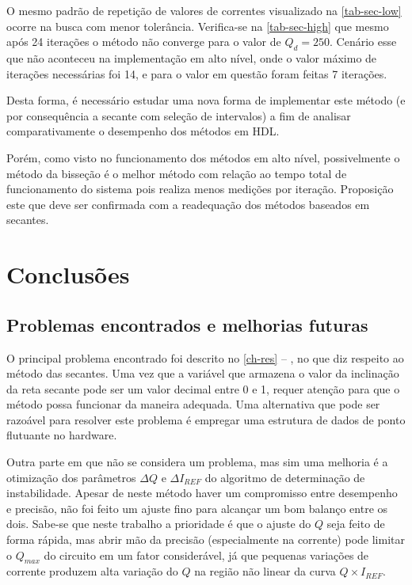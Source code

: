 O mesmo padrão de repetição de valores de correntes visualizado na \autoref{tab-sec-low} ocorre na busca com menor tolerância. Verifica-se na \autoref{tab-sec-high} que mesmo após 24 iterações o método não converge para o valor de $Q_d = 250$. Cenário esse que não aconteceu na implementação em alto nível, onde o valor máximo de iterações necessárias foi 14, e para o valor em  questão foram feitas 7 iterações.

Desta forma, é necessário estudar uma nova forma de implementar este método (e por consequência a secante com seleção de intervalos) a fim de analisar comparativamente o desempenho dos métodos em HDL. 

Porém, como visto no funcionamento dos métodos em alto nível, possivelmente o método da bisseção é o melhor método com relação ao tempo total de funcionamento do sistema pois realiza menos medições por iteração. Proposição este que deve ser confirmada com a readequação dos métodos baseados em secantes.

\part{Conclusões}


\chapter{Problemas encontrados e melhorias futuras}

O principal problema encontrado foi descrito no \autoref{ch-res} -- , no que diz respeito ao método das secantes. Uma vez que a variável que armazena o valor da inclinação da reta secante pode ser um valor decimal entre 0 e 1, requer atenção para que o método possa funcionar da maneira adequada. Uma alternativa que pode ser razoável para resolver este problema é empregar uma estrutura de dados de ponto flutuante no hardware.

Outra parte em que não se considera um problema, mas sim uma melhoria é a otimização dos parâmetros $\Delta Q$ e $\Delta I_{REF}$ do algoritmo de determinação de instabilidade. Apesar de neste método haver um compromisso entre desempenho e precisão, não foi feito um ajuste fino para alcançar um bom balanço entre os dois. Sabe-se que neste trabalho a prioridade é que o ajuste do $Q$ seja feito de forma rápida, mas abrir mão da precisão (especialmente na corrente) pode limitar o $Q_{max}$ do circuito em um fator considerável, já que pequenas variações de corrente produzem alta variação do $Q$ na região não linear da curva $Q \times I_{REF}$. 

